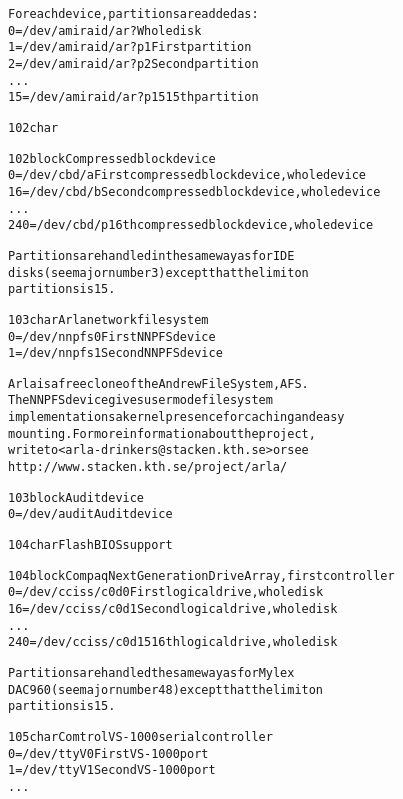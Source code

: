 \documentclass[a4paper,8pt,english]{sphinxmanual}
\begin{document}
\begin{alltt}
                For each device, partitions are added as:
                  0 = /dev/amiraid/ar?    Whole disk
                  1 = /dev/amiraid/ar?p1  First partition
                  2 = /dev/amiraid/ar?p2  Second partition
                    ...
                 15 = /dev/amiraid/ar?p15 15th partition

 102 char

 102 block      Compressed block device
                  0 = /dev/cbd/a        First compressed block device, whole device
                 16 = /dev/cbd/b        Second compressed block device, whole device
                    ...
                240 = /dev/cbd/p        16th compressed block device, whole device

                Partitions are handled in the same way as for IDE
                disks (see major number 3) except that the limit on
                partitions is 15.

 103 char       Arla network file system
                  0 = /dev/nnpfs0       First NNPFS device
                  1 = /dev/nnpfs1       Second NNPFS device

                Arla is a free clone of the Andrew File System, AFS.
                The NNPFS device gives user mode filesystem
                implementations a kernel presence for caching and easy
                mounting.  For more information about the project,
                write to \textless{}arla-drinkers@stacken.kth.se\textgreater{} or see
                http://www.stacken.kth.se/project/arla/

 103 block      Audit device
                  0 = /dev/audit        Audit device

 104 char       Flash BIOS support

 104 block      Compaq Next Generation Drive Array, first controller
                  0 = /dev/cciss/c0d0   First logical drive, whole disk
                 16 = /dev/cciss/c0d1   Second logical drive, whole disk
                    ...
                240 = /dev/cciss/c0d15  16th logical drive, whole disk

                Partitions are handled the same way as for Mylex
                DAC960 (see major number 48) except that the limit on
                partitions is 15.

 105 char       Comtrol VS-1000 serial controller
                  0 = /dev/ttyV0        First VS-1000 port
                  1 = /dev/ttyV1        Second VS-1000 port
                    ...


\end{alltt}
\end{document}
